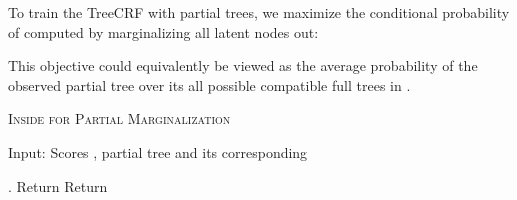 To train the TreeCRF with partial trees, 
we maximize the conditional probability of  computed by marginalizing all latent nodes \scalebox{0.8}{} out:


This objective could equivalently be viewed as the average probability of the observed partial tree  over its all possible compatible full trees in . 








\begin{algorithm}[t]
  \small
  \caption{\label{alg:partial_summation} \textsc{Inside for Partial Marginalization}}
  \begin{algorithmic}[1]
  
  \State Input: Scores , partial tree  and its corresponding 
    \If{} 
      \State    \label{alg:line_observed_1}  
      \State 
    \ElsIf{\square} \label{alg:line_latent_1}  
      \State  \label{alg:line_latent_o_1}
      \State  \label{alg:line_latent_l_1}
    \EndIf
  \EndFor

      \State 
      \If{}  
        \State  
        \State \begin{varwidth}[h]{\linewidth}
           \par
            \hskip\algorithmicindent 
          \end{varwidth} \label{alg:line_observed_2}
        \State 
      \ElsIf{\square} \label{alg:line_latent_2} \label{alg:line_latent_2} 
        \State \begin{varwidth}[h]{\linewidth} \label{alg:line_latent_l_2}
           \par
            \hskip\algorithmicindent 
          \end{varwidth}
        \State  \label{alg:line_latent_o_2}
      \ElsIf{} \label{alg:line_rejected} 
        \State  \label{alg:line_sum_end}
      \EndIf
    \EndFor
  \EndFor

  \If{}  \label{alg:line_observed_3}  
    \State . Return 
  \ElsIf{\square} \label{alg:line_latent_3} 
    \State Return  \label{alg:line_latent_l_3}
  \EndIf
  
\end{algorithmic}
\end{algorithm} 
